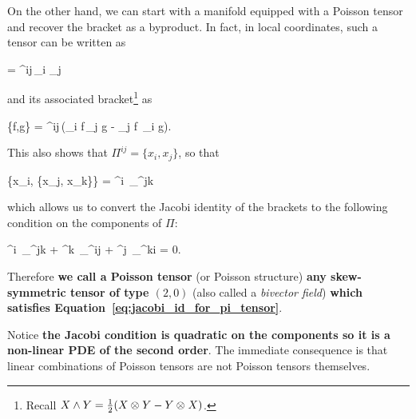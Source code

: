 \documentclass[main.tex]{subfiles}
\begin{document}
On the other hand, we can start with a manifold equipped with a Poisson tensor and recover the bracket as a byproduct. In fact, in local coordinates, such a tensor can be written as
\begin{eqalign}
	\Pi =  \Pi^{ij}\,\partial_i \wedge \partial_j
\end{eqalign}
and its associated bracket\footnote{Recall $X \wedge Y = \frac12 (X \otimes_{} Y - Y \otimes_{} X)$.} as
\begin{eqalign}
	\{f,g\} =  \Pi^{ij}\,(\partial_i f\,\partial_j g - \partial_j f\, \partial_i g).
\end{eqalign}
This also shows that $\Pi^{ij} = \{x_i, x_j\}$, so that
\begin{eqalign}
	\{x_i, \{x_j, x_k\}\} =  \Pi^{i\ell}\, \partial_\ell \Pi^{jk}
\end{eqalign}
which allows us to convert the Jacobi identity of the brackets to the following condition on the components of $\Pi$:
\begin{eqalign}
\label{eq:jacobi_id_for_pi_tensor}
	\Pi^{i\ell}\, \partial_\ell \Pi^{jk} + \Pi^{k\ell}\, \partial_\ell \Pi^{ij} + \Pi^{j\ell}\, \partial_\ell \Pi^{ki} = 0.
\end{eqalign}
Therefore \textbf{we call a Poisson tensor} (or Poisson structure) \textbf{any skew-symmetric tensor of type $(2, 0)$} (also called a \emph{bivector field}) \textbf{which satisfies Equation~\ref{eq:jacobi_id_for_pi_tensor}}.

\begin{remark}
	Notice \textbf{the Jacobi condition is quadratic on the components so it is a non-linear PDE of the second order}. The immediate consequence is that linear combinations of Poisson tensors are not Poisson tensors themselves.
\end{remark}
\end{document}
